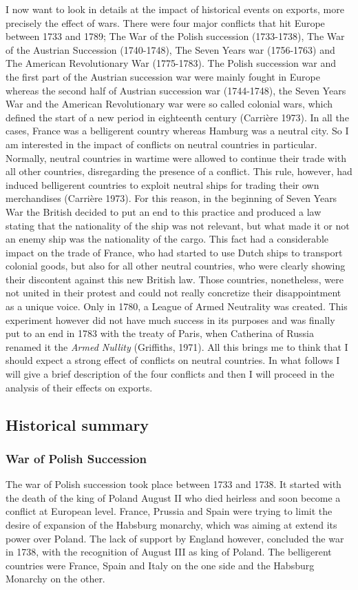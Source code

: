 \documentclass[12pt,a4paper,titlepage]{article}
\begin{document}
I now want to look in details at the impact of historical events on exports, more precisely the effect of wars. There were four major conflicts that hit Europe between 1733 and 1789; The War of the Polish succession (1733-1738), The War of the Austrian Succession (1740-1748), The Seven Years war (1756-1763) and The American Revolutionary War (1775-1783). The Polish succession war and the first part of the Austrian succession war were mainly fought in Europe whereas the second half of Austrian succession war (1744-1748), the Seven Years War and the American Revolutionary war were so called colonial wars, which defined the start of a new period in eighteenth century (Carrière 1973). In all the cases, France was a belligerent country whereas Hamburg was a neutral city. So I am interested in the impact of conflicts on neutral countries in particular. Normally, neutral countries in wartime were allowed to continue their trade with all other countries, disregarding the presence of a conflict.  This rule, however, had induced belligerent countries to exploit neutral ships for trading their own merchandises (Carrière 1973). For this reason, in the beginning of Seven Years War the British decided to put an end to this practice and produced a law stating that the nationality of the ship was not relevant, but what made it or not an enemy ship was the nationality of the cargo. This fact had a considerable impact on the trade of France, who had started to use Dutch ships to transport colonial goods, but also for all other neutral countries, who were clearly showing their discontent against this new British law. Those countries, nonetheless, were not united in their protest and could not really concretize their disappointment as a unique voice. Only in 1780, a League of Armed Neutrality was created. This experiment however did not have much success in its purposes and was finally put to an end in 1783 with the treaty of Paris, when Catherina of Russia renamed it the \textit{Armed Nullity} (Griffiths, 1971). 
All this brings me to think that I should expect a strong effect of conflicts on neutral countries. 
In what follows I will give a brief description of the four conflicts and then I will proceed in the analysis of their effects on exports. 

\subsection{Historical summary}
\subsubsection{War of Polish Succession}
The war of Polish succession took place between 1733 and 1738. It started with the death of the king of Poland August II who died heirless and soon become a conflict at European level. France, Prussia and Spain were trying to limit the desire of expansion of the Habsburg monarchy, which was aiming at extend its power over Poland. The lack of support by England however, concluded the war in 1738, with the recognition of August III as king of Poland. The belligerent countries were France, Spain and Italy on the one side and the Habsburg Monarchy on the other. 
\end{document}
